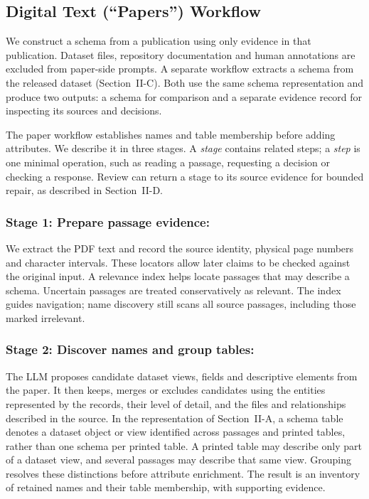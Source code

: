 
\subsection{Digital Text (``Papers'') Workflow}
\label{sec:paper-workflow}

We construct a schema from a publication using only evidence in that
publication. Dataset files, repository documentation and human annotations
are excluded from paper-side prompts. A separate workflow extracts a schema
from the released dataset (Section~II-C). Both use the
same schema representation and produce two outputs: a schema for comparison
and a separate evidence record for inspecting its sources and decisions.

The paper workflow establishes names and table membership before adding
attributes. We describe it in three stages. A \emph{stage} contains related
steps; a \emph{step} is one minimal operation, such as reading a passage,
requesting a decision or checking a response. Review can return a stage to
its source evidence for bounded repair, as described in
Section~II-D.

\subsubsection{Stage 1: Prepare passage evidence:}
We extract the PDF text and record the source identity, physical page
numbers and character intervals. These locators allow later claims to be
checked against the original input. A relevance index helps locate passages
that may describe a schema. Uncertain passages are treated conservatively
as relevant. The index guides navigation; name discovery still scans all
source passages, including those marked irrelevant.

\subsubsection{Stage 2: Discover names and group tables:}
The LLM proposes candidate dataset views, fields and descriptive elements
from the paper. It then keeps, merges or excludes candidates using the
entities represented by the records, their level of detail, and the files
and relationships described in the source. In the representation of
Section~II-A, a schema table denotes a dataset object or view identified
across passages and printed tables, rather than one schema per printed
table. A printed table may describe only part of a dataset view, and several
passages may describe that same view. Grouping resolves these distinctions
before attribute enrichment.
The result is an inventory of retained names and their table membership,
with supporting evidence.

